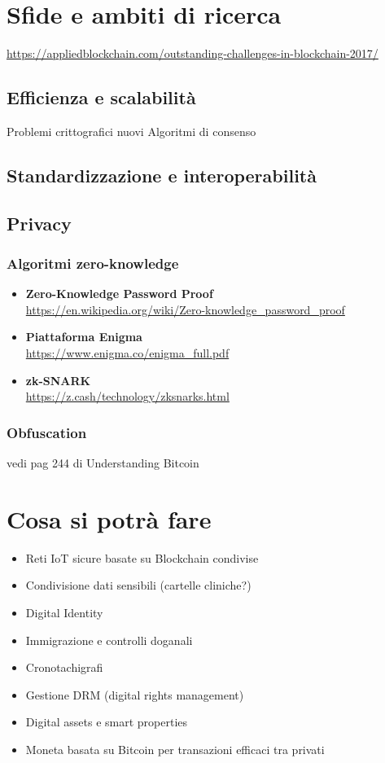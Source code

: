 \section{Sfide e ambiti di ricerca}
    \url{https://appliedblockchain.com/outstanding-challenges-in-blockchain-2017/}
    \subsection{Efficienza e scalabilità}
        Problemi crittografici nuovi
        Algoritmi di consenso
    \subsection{Standardizzazione e interoperabilità}
    \subsection{Privacy}
        \subsubsection{Algoritmi zero-knowledge}
            \begin{itemize}
                \item \textbf{Zero-Knowledge Password Proof} \\
                    \url{https://en.wikipedia.org/wiki/Zero-knowledge_password_proof}
                \item \textbf{Piattaforma Enigma} \\
                        \url{https://www.enigma.co/enigma_full.pdf}
                \item \textbf{zk-SNARK} \\
                    \url{https://z.cash/technology/zksnarks.html}
            \end{itemize}
        \subsubsection{Obfuscation}
            vedi pag 244 di Understanding Bitcoin

\section{Cosa si potrà fare}
\begin{itemize}
    \item Reti IoT sicure basate su Blockchain condivise
    \item Condivisione dati sensibili (cartelle cliniche?)
    \item Digital Identity
    \item Immigrazione e controlli doganali
    \item Cronotachigrafi
    \item Gestione DRM (digital rights management)
    \item Digital assets e smart properties
    \item Moneta basata su Bitcoin per transazioni efficaci tra privati
\end{itemize}
